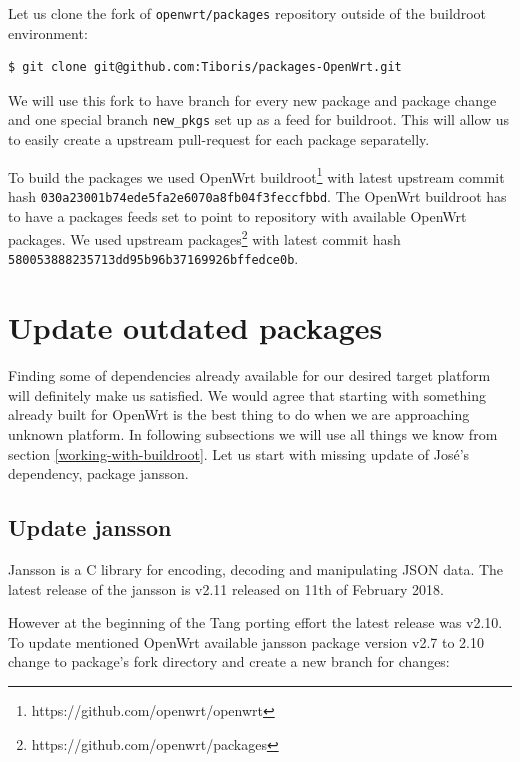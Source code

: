 Let us clone the fork of {\tt openwrt/packages} repository outside of the buildroot environment:
\begin{lstlisting}[columns=fixed,basicstyle=\ttfamily\footnotesize,tabsize=4,backgroundcolor=\color{yellow!10}]
$ git clone git@github.com:Tiboris/packages-OpenWrt.git
\end{lstlisting}
We will use this fork to have branch for every new package and package change and one special branch {\tt new\_pkgs} set up as a feed for buildroot.
This will allow us to easily create a upstream pull-request for each package separatelly.

To build the packages we used OpenWrt buildroot\footnote{https://github.com/openwrt/openwrt} with latest upstream commit hash {\tt 030a23001b74ede5fa2e6070a8fb04f3feccfbbd}.
The OpenWrt buildroot has to have a packages feeds set to point to repository with available OpenWrt packages.
We used upstream packages\footnote{https://github.com/openwrt/packages} with latest commit hash {\tt 580053888235713dd95b96b37169926bffedce0b}.


\section{Update outdated packages}

Finding some of dependencies already available for our desired target platform will definitely make us satisfied.
We would agree that starting with something already built for OpenWrt is the best thing to do when we are approaching unknown platform.
In following subsections we will use all things we know from section \ref{working-with-buildroot}.
Let us start with missing update of José's dependency, package jansson.



\subsection{Update jansson}\label{jansson}
Jansson is a C library for encoding, decoding and manipulating JSON data.
The latest release of the jansson is v2.11 released on 11th of February 2018\cite{jansson}.

However at the beginning of the Tang porting effort the latest release was v2.10.
To update mentioned OpenWrt available jansson package version v2.7 to 2.10 change to package's fork directory and create a new branch for changes:


